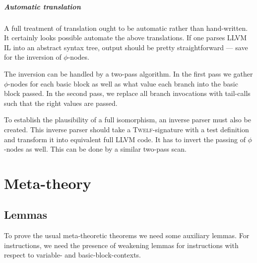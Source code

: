 \documentclass[a4paper, oneside, 10pt, draft]{memoir}
\newcommand{\twelf}{\textsc{Twelf}}
\begin{document}
\paragraph{Automatic translation}

A full treatment of translation ought to be automatic rather than
hand-written. It certainly looks possible automate the above
translations. If one parses LLVM IL into an abstract syntax tree,
output should be pretty straightforward --- save for the inversion of
$\phi$-nodes.

The inversion can be handled by a two-pass algorithm. In the first
pass we gather $\phi$-nodes for each basic block as well as what value
each branch into the basic block passed. In the second pass, we
replace all branch invocations with tail-calls such that the right
values are passed.

To establish the plausibility of a full isomorphism, an inverse parser
must also be created. This inverse parser should take a
\twelf{}-signature with a test definition and transform it into
equivalent full LLVM code. It has to invert the passing of
$\phi$-nodes as well. This can be done by a similar two-pass scan.

\chapter{Meta-theory}

\section{Lemmas}

To prove the usual meta-theoretic theorems we need some auxiliary
lemmas. For instructions, we need the presence of weakening lemmas for
instructions with respect to variable- and basic-block-contexts.
\end{document}
